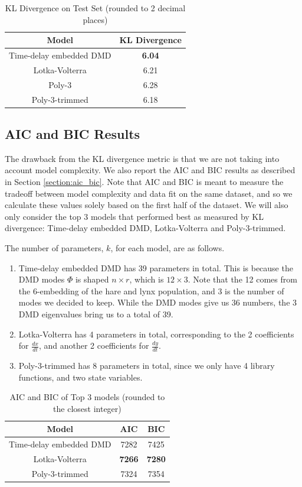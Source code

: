 \documentclass[letterpaper, 10 pt, conference]{ieeeconf}  %
\begin{document}
\begin{table}[ht]
\caption{KL Divergence on Test Set (rounded to 2 decimal places)} %
\centering %
\begin{tabular}{c c} 
\hline\hline 
Model & KL Divergence \\
\hline
Time-delay embedded DMD & \textbf{6.04} \\
Lotka-Volterra & 6.21 \\
Poly-3 & 6.28 \\
Poly-3-trimmed & 6.18 \\
\hline %
\end{tabular}
\label{tbl:kl_div}
\end{table}

\subsection{AIC and BIC Results}
The drawback from the KL divergence metric is that we are not taking into account model complexity. We also report the AIC and BIC results as described in Section \ref{section:aic_bic}. Note that AIC and BIC is meant to measure the tradeoff between model complexity and data fit on the same dataset, and so we calculate these values solely based on the first half of the dataset. We will also only consider the top 3 models that performed best as measured by KL divergence: Time-delay embedded DMD, Lotka-Volterra and Poly-3-trimmed.

The number of parameters, $k$, for each model, are as follows.
\begin{enumerate}
    \item{Time-delay embedded DMD has 39 parameters in total. This is because the DMD modes $\Phi$ is shaped $n \times r$, which is $12 \times 3$. Note that the 12 comes from the 6-embedding of the hare and lynx population, and 3 is the number of modes we decided to keep. While the DMD modes give us 36 numbers, the 3 DMD eigenvalues bring us to a total of 39.}
    \item{Lotka-Volterra has 4 parameters in total, corresponding to the 2 coefficients for $\frac{dx}{dt}$, and another 2 coefficients for $\frac{dy}{dt}$.}
    \item{Poly-3-trimmed has 8 parameters in total, since we only have 4 library functions, and two state variables.}
\end{enumerate}

\begin{table}[ht]
\caption{AIC and BIC of Top 3 models (rounded to the closest integer)} %
\centering %
\begin{tabular}{c c c} 
\hline\hline 
Model & AIC & BIC \\
\hline
Time-delay embedded DMD & 7282 & 7425 \\
Lotka-Volterra & \textbf{7266} & \textbf{7280} \\
Poly-3-trimmed & 7324 & 7354 \\
\hline %
\end{tabular}
\label{tbl:kl_div}
\end{table}
\end{document}
